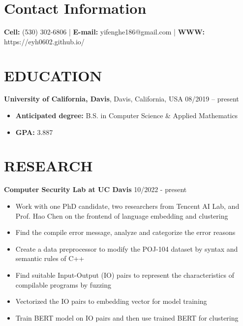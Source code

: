 \documentclass[margin,line]{res}
\begin{document}

\begin{resume}
\section{\sc Contact Information}
\vspace{.05in}
\textbf{Cell:} (530) 302-6806 |
\textbf{E-mail:} yifenghe186@gmail.com |
\textbf{WWW:} https://eyh0602.github.io/



\section{\sc EDUCATION}
\textbf{University of California, Davis}, Davis, California, USA \hfill {08/2019 -- present} \\
\begin{itemize}
	\item \textbf{Anticipated degree:} B.S. in Computer Science \& Applied Mathematics
	\item \textbf{GPA:} 3.887
\end{itemize}

\section{\sc RESEARCH}
\textbf{Computer Security Lab at UC Davis} \hfill 10/2022 - present \\
\begin{itemize}
	\item Work with one PhD candidate, two researchers from Tencent AI Lab, and Prof. Hao Chen on the frontend of language embedding and clustering 
	\item Find the compile error message, analyze and categorize the error reasons 
	\item Create a data preprocessor to modify the POJ-104 dataset by syntax and semantic rules of C++ 
	\item Find suitable Input-Output (IO) pairs to represent the characteristics of compilable programs by fuzzing
	\item Vectorized the IO pairs to embedding vector for model training 
	\item Train BERT model on IO pairs and then use trained BERT for clustering 
\end{itemize}


\end{resume}
\end{document}
